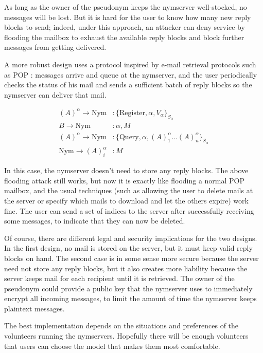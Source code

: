 \documentclass[11pt]{IEEEtran}
\begin{document}
As long
as the owner of the pseudonym keeps the nymserver well-stocked, no
messages will be lost.  But it is hard for the user to know how many
new reply blocks to send; indeed, under this approach, an attacker can
deny service by flooding the mailbox to exhaust the available
reply blocks and block further messages from getting delivered.

A more robust design uses a protocol inspired by e-mail retrieval
protocols such as POP \cite{POP3}:
messages arrive and queue at the nymserver, and the user periodically
checks the status of his mail and sends a sufficient batch of reply
blocks so the nymserver can deliver that mail.

\begin{equation}
\begin{aligned}
(A)^\alpha \rightarrow \mathrm{Nym}&: \{\mathrm{Register} , \alpha, V_{\alpha}\}_{S_{\alpha}}\\
B \rightarrow \mathrm{Nym}&: \alpha, M \\
(A)^\alpha \rightarrow \mathrm{Nym}&: \{\mathrm{Query} ,\alpha, (A)^\alpha_1 \dots
(A)^\alpha_n\}_{S_{\alpha}} \\
\mathrm{Nym} \rightarrow (A)^\alpha_i&: M
\end{aligned}
\end{equation}

In this case, the nymserver doesn't need to store any reply blocks.
The above flooding attack still works, but now it is exactly
like flooding a normal POP mailbox, and the usual techniques (such as
allowing the user to delete mails at the server or specify which mails to
download and let the others expire) work fine. The user can send a set
of indices to the server after successfully receiving
some messages, to indicate that they can now be deleted.

Of course, there are different legal and security implications for the two
designs. In the first design, no mail is stored on the server, but it must
keep valid reply blocks on hand. The second case is in some sense more
secure because the server need not store any reply blocks, but it also
creates more liability because the server keeps mail for each recipient
until it is retrieved. The owner of the pseudonym could provide a public
key that the nymserver uses to immediately encrypt all incoming messages,
to limit the amount of time the nymserver keeps plaintext messages.

The best implementation depends on the situations and preferences of
the volunteers running the nymservers. Hopefully there will be enough
volunteers that users can choose the model that makes them most
comfortable.
\end{document}
